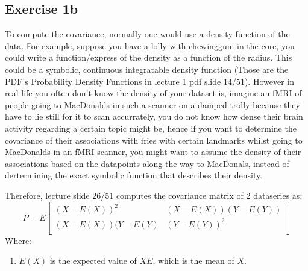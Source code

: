 \newpage
\subsection{Exercise 1b}
To compute the covariance, normally one would use a density function of the data. For example, suppose you have a lolly with chewinggum in the core, you could write a function/express of the density as a function of the radius. This could be a symbolic, continuous integratable density function (Those are the PDF's {Probability Density Functions} in lecture 1 pdf slide 14/51). However in real life you often don't know the density of your dataset is, imagine an fMRI of people going to MacDonalds in such a scanner on a damped trolly because they have to lie still for it to scan accurrately, you do not know how dense their brain activity regarding a certain topic might be, hence if you want to determine the covariance of their associations with fries with certain landmarks whilst going to MacDonalds in an fMRI scanner, you might want to assume the density of their associations based on the datapoints along the way to MacDonals, instead of dertermining the exact symbolic function that describes their density.

Therefore, lecture slide 26/51 computes the covariance matrix of 2 dataseries as:
\begin{equation}
P=E
\begin{bmatrix}
    {(X-E(X))}^2       & (X-E(X))(Y-E(Y))\\
    (X-E(X))(Y-E(Y)    & {(Y-E(Y))}^2\\
\end{bmatrix}    
\label{eq:covariance_with_expected_value}
\end{equation}
Where:

\begin{enumerate}
    \item $E(X)$ is the expected value of $XE$, which is the mean of $X$.
\end{enumerate}


